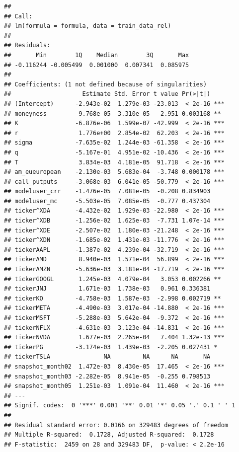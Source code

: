 \documentclass[
]{article}
\begin{document}
\begin{verbatim}
## 
## Call:
## lm(formula = formula, data = train_data_rel)
## 
## Residuals:
##       Min        1Q    Median        3Q       Max 
## -0.116244 -0.005499  0.001000  0.007341  0.085975 
## 
## Coefficients: (1 not defined because of singularities)
##                    Estimate Std. Error t value Pr(>|t|)    
## (Intercept)      -2.943e-02  1.279e-03 -23.013  < 2e-16 ***
## moneyness         9.768e-05  3.310e-05   2.951 0.003168 ** 
## K                -6.876e-06  1.599e-07 -42.999  < 2e-16 ***
## r                 1.776e+00  2.854e-02  62.203  < 2e-16 ***
## sigma            -7.635e-02  1.244e-03 -61.358  < 2e-16 ***
## q                -5.167e-01  4.951e-02 -10.436  < 2e-16 ***
## T                 3.834e-03  4.181e-05  91.718  < 2e-16 ***
## am_eueuropean    -2.130e-03  5.683e-04  -3.748 0.000178 ***
## call_putputs     -3.068e-03  6.041e-05 -50.779  < 2e-16 ***
## modeluser_crr    -1.476e-05  7.081e-05  -0.208 0.834903    
## modeluser_mc     -5.503e-05  7.085e-05  -0.777 0.437304    
## ticker^XDA       -4.432e-02  1.929e-03 -22.980  < 2e-16 ***
## ticker^XDB       -1.256e-02  1.625e-03  -7.731 1.07e-14 ***
## ticker^XDE       -2.507e-02  1.180e-03 -21.248  < 2e-16 ***
## ticker^XDN       -1.685e-02  1.431e-03 -11.776  < 2e-16 ***
## tickerAAPL       -1.387e-02  4.239e-04 -32.719  < 2e-16 ***
## tickerAMD         8.940e-03  1.571e-04  56.899  < 2e-16 ***
## tickerAMZN       -5.636e-03  3.181e-04 -17.719  < 2e-16 ***
## tickerGOOGL       1.245e-03  4.079e-04   3.053 0.002266 ** 
## tickerJNJ         1.671e-03  1.738e-03   0.961 0.336381    
## tickerKO         -4.758e-03  1.587e-03  -2.998 0.002719 ** 
## tickerMETA       -4.490e-03  3.017e-04 -14.880  < 2e-16 ***
## tickerMSFT       -5.288e-03  5.642e-04  -9.372  < 2e-16 ***
## tickerNFLX       -4.631e-03  3.123e-04 -14.831  < 2e-16 ***
## tickerNVDA        1.677e-03  2.265e-04   7.404 1.32e-13 ***
## tickerPG         -3.174e-03  1.439e-03  -2.205 0.027431 *  
## tickerTSLA               NA         NA      NA       NA    
## snapshot_month02  1.472e-03  8.430e-05  17.465  < 2e-16 ***
## snapshot_month03 -2.282e-05  8.941e-05  -0.255 0.798513    
## snapshot_month05  1.251e-03  1.091e-04  11.460  < 2e-16 ***
## ---
## Signif. codes:  0 '***' 0.001 '**' 0.01 '*' 0.05 '.' 0.1 ' ' 1
## 
## Residual standard error: 0.0166 on 329483 degrees of freedom
## Multiple R-squared:  0.1728, Adjusted R-squared:  0.1728 
## F-statistic:  2459 on 28 and 329483 DF,  p-value: < 2.2e-16
\end{verbatim}
\end{document}
